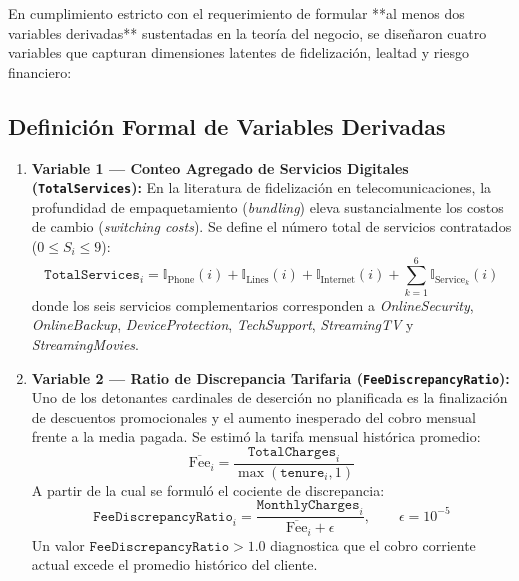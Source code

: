 \documentclass[11pt,letterpaper]{article}
\begin{document}
En cumplimiento estricto con el requerimiento de formular **al menos dos variables derivadas** sustentadas en la teoría del negocio, se diseñaron cuatro variables que capturan dimensiones latentes de fidelización, lealtad y riesgo financiero:

\subsection{Definición Formal de Variables Derivadas}

\begin{enumerate}
    \item \textbf{Variable 1 — Conteo Agregado de Servicios Digitales (\texttt{TotalServices}):}
    En la literatura de fidelización en telecomunicaciones, la profundidad de empaquetamiento (\textit{bundling}) eleva sustancialmente los costos de cambio (\textit{switching costs}). Se define el número total de servicios contratados ($0 \le S_i \le 9$):
    \begin{equation}
        \texttt{TotalServices}_i = \mathbb{I}_{\text{Phone}}(i) + \mathbb{I}_{\text{Lines}}(i) + \mathbb{I}_{\text{Internet}}(i) + \sum_{k=1}^6 \mathbb{I}_{\text{Service}_k}(i)
    \end{equation}
    donde los seis servicios complementarios corresponden a \textit{OnlineSecurity}, \textit{OnlineBackup}, \textit{DeviceProtection}, \textit{TechSupport}, \textit{StreamingTV} y \textit{StreamingMovies}.

    \item \textbf{Variable 2 — Ratio de Discrepancia Tarifaria (\texttt{FeeDiscrepancyRatio}):}
    Uno de los detonantes cardinales de deserción no planificada es la finalización de descuentos promocionales y el aumento inesperado del cobro mensual frente a la media pagada. Se estimó la tarifa mensual histórica promedio:
    \begin{equation}
        \overline{\text{Fee}}_i = \frac{\texttt{TotalCharges}_i}{\max(\texttt{tenure}_i, 1)}
    \end{equation}
    A partir de la cual se formuló el cociente de discrepancia:
    \begin{equation}
        \texttt{FeeDiscrepancyRatio}_i = \frac{\texttt{MonthlyCharges}_i}{\overline{\text{Fee}}_i + \epsilon}, \qquad \epsilon = 10^{-5}
    \end{equation}
    Un valor $\texttt{FeeDiscrepancyRatio} > 1.0$ diagnostica que el cobro corriente actual excede el promedio histórico del cliente.


\end{enumerate}
\end{document}
